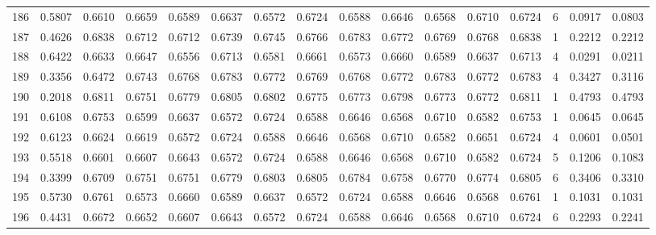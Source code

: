 \begin{tabular}{lrrrrrrrrrrrrrrr}
186 &      0.5807 &  0.6610 &  0.6659 &  0.6589 &  0.6637 &  0.6572 &  0.6724 &  0.6588 &  0.6646 &  0.6568 &   0.6710 &     0.6724 &      6 &                    0.0917 &                     0.0803 \\
187 &      0.4626 &  0.6838 &  0.6712 &  0.6712 &  0.6739 &  0.6745 &  0.6766 &  0.6783 &  0.6772 &  0.6769 &   0.6768 &     0.6838 &      1 &                    0.2212 &                     0.2212 \\
188 &      0.6422 &  0.6633 &  0.6647 &  0.6556 &  0.6713 &  0.6581 &  0.6661 &  0.6573 &  0.6660 &  0.6589 &   0.6637 &     0.6713 &      4 &                    0.0291 &                     0.0211 \\
189 &      0.3356 &  0.6472 &  0.6743 &  0.6768 &  0.6783 &  0.6772 &  0.6769 &  0.6768 &  0.6772 &  0.6783 &   0.6772 &     0.6783 &      4 &                    0.3427 &                     0.3116 \\
190 &      0.2018 &  0.6811 &  0.6751 &  0.6779 &  0.6805 &  0.6802 &  0.6775 &  0.6773 &  0.6798 &  0.6773 &   0.6772 &     0.6811 &      1 &                    0.4793 &                     0.4793 \\
191 &      0.6108 &  0.6753 &  0.6599 &  0.6637 &  0.6572 &  0.6724 &  0.6588 &  0.6646 &  0.6568 &  0.6710 &   0.6582 &     0.6753 &      1 &                    0.0645 &                     0.0645 \\
192 &      0.6123 &  0.6624 &  0.6619 &  0.6572 &  0.6724 &  0.6588 &  0.6646 &  0.6568 &  0.6710 &  0.6582 &   0.6651 &     0.6724 &      4 &                    0.0601 &                     0.0501 \\
193 &      0.5518 &  0.6601 &  0.6607 &  0.6643 &  0.6572 &  0.6724 &  0.6588 &  0.6646 &  0.6568 &  0.6710 &   0.6582 &     0.6724 &      5 &                    0.1206 &                     0.1083 \\
194 &      0.3399 &  0.6709 &  0.6751 &  0.6751 &  0.6779 &  0.6803 &  0.6805 &  0.6784 &  0.6758 &  0.6770 &   0.6774 &     0.6805 &      6 &                    0.3406 &                     0.3310 \\
195 &      0.5730 &  0.6761 &  0.6573 &  0.6660 &  0.6589 &  0.6637 &  0.6572 &  0.6724 &  0.6588 &  0.6646 &   0.6568 &     0.6761 &      1 &                    0.1031 &                     0.1031 \\
196 &      0.4431 &  0.6672 &  0.6652 &  0.6607 &  0.6643 &  0.6572 &  0.6724 &  0.6588 &  0.6646 &  0.6568 &   0.6710 &     0.6724 &      6 &                    0.2293 &                     0.2241 \\

\end{tabular}
